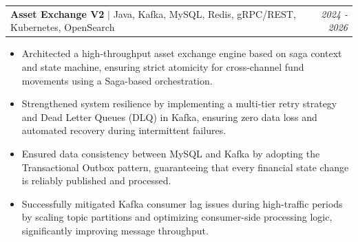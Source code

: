 \documentclass[letterpaper,11pt]{article}
\makeatletter
\newcommand{\resumeItem}[1]{
  \item\small{
    {#1 \vspace{-1pt}}
  }
}
\newcommand{\resumeProjectHeading}[2]{
    \vspace{-5pt}\item
    \begin{tabular*}{1.001\textwidth}{l@{\extracolsep{\fill}}r}
      \small#1 & \textit{\small #2}\\ %
    \end{tabular*}\vspace{-7pt}
}
\newcommand{\resumeItemListStart}{\begin{itemize}[leftmargin=0.1in]}
\newcommand{\resumeItemListEnd}{\end{itemize}\vspace{-5pt}}
\makeatother
\begin{document}
    \resumeProjectHeading
      {\textbf{Asset Exchange V2} $|$ \small{Java, Kafka, MySQL, Redis, gRPC/REST, Kubernetes, OpenSearch}}{2024 - 2026}
      \resumeItemListStart
        \resumeItem{\normalsize{Architected a high-throughput asset exchange engine based on saga context and state machine, ensuring strict atomicity for cross-channel fund movements using a Saga-based orchestration.}}
        \resumeItem{\normalsize{Strengthened system resilience by implementing a multi-tier retry strategy and Dead Letter Queues (DLQ) in Kafka, ensuring zero data loss and automated recovery during intermittent failures.}}
        \resumeItem{\normalsize{Ensured data consistency between MySQL and Kafka by adopting the Transactional Outbox pattern, guaranteeing that every financial state change is reliably published and processed.}}
        \resumeItem{\normalsize{Successfully mitigated Kafka consumer lag issues during high-traffic periods by scaling topic partitions and optimizing consumer-side processing logic, significantly improving message throughput.}}
      \resumeItemListEnd


\end{document}

